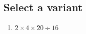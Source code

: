 \documentclass{exam}
\begin{document}
\subsection*{Select a variant}
\begin{enumerate}[1)]
\item $2 \times 4 \times 20 \div 16$
\end{enumerate}
\end{document}
